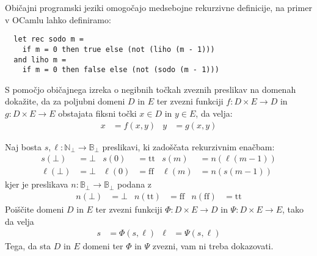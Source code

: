 \documentclass{izpit}
\begin{document}

\naloga[\tocke{25}]
Običajni programski jeziki omogočajo medsebojne rekurzivne definicije, na primer v OCamlu lahko definiramo:
\begin{verbatim}
  let rec sodo m =
    if m = 0 then true else (not (liho (m - 1)))
  and liho m =
    if m = 0 then false else (not (sodo (m - 1)))
\end{verbatim}

\podnaloga
S pomočjo običajnega izreka o negibnih točkah zveznih preslikav na domenah dokažite, da za poljubni domeni $D$ in $E$ ter zvezni funkciji $f \colon D \times E \to D$ in $g \colon D \times E \to E$ obstajata fiksni točki $x \in D$ in $y \in E$, da velja:
\begin{align*}
  x &= f(x, y) &
  y &= g(x, y)
\end{align*}
\prostor

\podnaloga
Naj bosta $s, \ell \colon \mathbb{N}_\bot \to \mathbb{B}_\bot$ preslikavi, ki zadoščata rekurzivnim enačbam:
\begin{align*}
  s(\bot) &= \bot &
  s(0) &= \mathrm{tt} &
  s(m) &= n (\ell(m - 1)) \\
  \ell(\bot) &= \bot &
  \ell(0) &= \mathrm{ff} &
  \ell(m) &= n (s(m - 1))
\end{align*}
kjer je preslikava $n \colon \mathbb{B}_\bot \to \mathbb{B}_\bot$ podana z
\begin{align*}
  n(\bot) &= \bot &
  n(\mathrm{tt}) &= \mathrm{ff} &
  n(\mathrm{ff}) &= \mathrm{tt}
\end{align*}
Poiščite domeni $D$ in $E$ ter zvezni funkciji $\Phi \colon D \times E \to D$ in $\Psi \colon D \times E \to E$, tako da velja
\begin{align*}
  s &= \Phi(s, \ell) &
  \ell &= \Psi(s, \ell)
\end{align*}
Tega, da sta $D$ in $E$ domeni ter $\Phi$ in $\Psi$ zvezni, vam ni treba dokazovati.
\prostor
\end{document}
